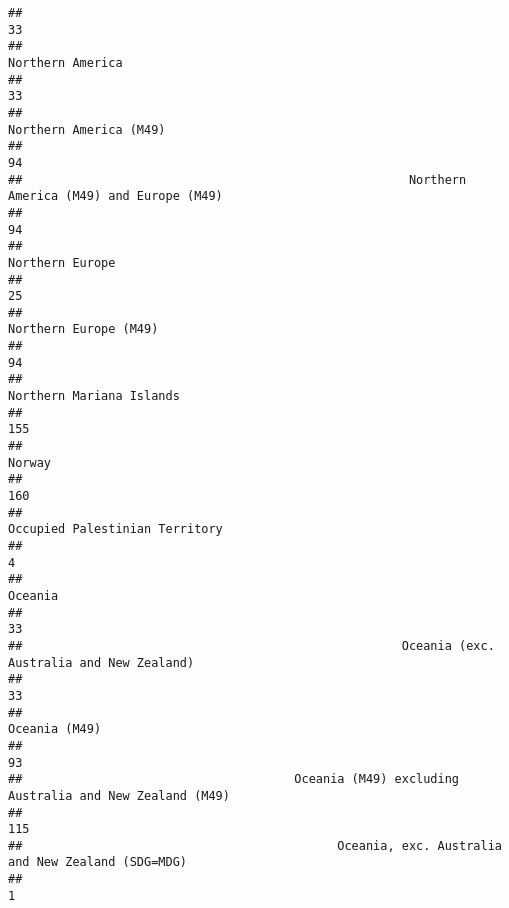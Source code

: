 \documentclass[]{article}
\begin{document}
\begin{verbatim}
##                                                                                           33 
##                                                                             Northern America 
##                                                                                           33 
##                                                                       Northern America (M49) 
##                                                                                           94 
##                                                      Northern America (M49) and Europe (M49) 
##                                                                                           94 
##                                                                              Northern Europe 
##                                                                                           25 
##                                                                        Northern Europe (M49) 
##                                                                                           94 
##                                                                     Northern Mariana Islands 
##                                                                                          155 
##                                                                                       Norway 
##                                                                                          160 
##                                                               Occupied Palestinian Territory 
##                                                                                            4 
##                                                                                      Oceania 
##                                                                                           33 
##                                                     Oceania (exc. Australia and New Zealand) 
##                                                                                           33 
##                                                                                Oceania (M49) 
##                                                                                           93 
##                                      Oceania (M49) excluding Australia and New Zealand (M49) 
##                                                                                          115 
##                                            Oceania, exc. Australia and New Zealand (SDG=MDG) 
##                                                                                            1 

\end{verbatim}
\end{document}

